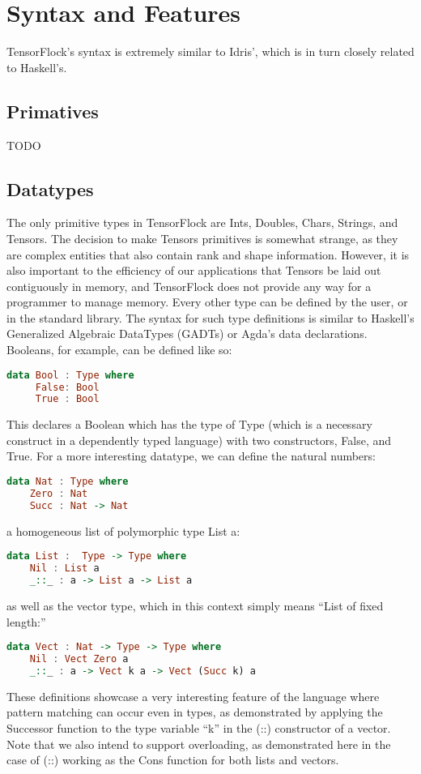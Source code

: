 \documentclass[12pt]{article}
\begin{document}
\section{Syntax and Features}
TensorFlock's syntax is extremely similar to Idris', which is in turn closely related to Haskell's.
\subsection{Primatives}
TODO
\subsection{Datatypes}
The only primitive types in TensorFlock are Ints, Doubles, Chars, Strings, and Tensors. The decision to make Tensors primitives is somewhat strange, as they are complex entities that also contain rank and shape information. However, it is also important to the efficiency of our applications that Tensors be laid out contiguously in memory, and TensorFlock does not provide any way for a programmer to manage memory. 
Every other type can be defined by the user, or in the standard library. The syntax for such type definitions is similar to Haskell's Generalized Algebraic DataTypes (GADTs) or Agda's data declarations. Booleans, for example, can be defined like so:
\begin{lstlisting}[language=Haskell]
data Bool : Type where
     False: Bool
     True : Bool
\end{lstlisting}
This declares a Boolean which has the type of Type (which is a necessary construct in a dependently typed language) with two constructors, False, and True. For a more interesting datatype, we can define the natural numbers:
\begin{lstlisting}[language=Haskell]
data Nat : Type where
    Zero : Nat
    Succ : Nat -> Nat
\end{lstlisting}
 a homogeneous list of polymorphic type List a:
\begin{lstlisting}[language=Haskell]
data List :  Type -> Type where
    Nil : List a    
    _::_ : a -> List a -> List a
\end{lstlisting}
as well as the vector type, which in this context simply means ``List of fixed length:''
\begin{lstlisting}[language=Haskell]
data Vect : Nat -> Type -> Type where
    Nil : Vect Zero a
    _::_ : a -> Vect k a -> Vect (Succ k) a
\end{lstlisting}
These definitions showcase a very interesting feature of the language where pattern matching can occur even in types, as demonstrated by applying the Successor function to the type variable ``k'' in the (::) constructor of a vector. Note that we also intend to support overloading, as demonstrated here in the case of (::) working as the Cons function for both lists and vectors.
\end{document}
